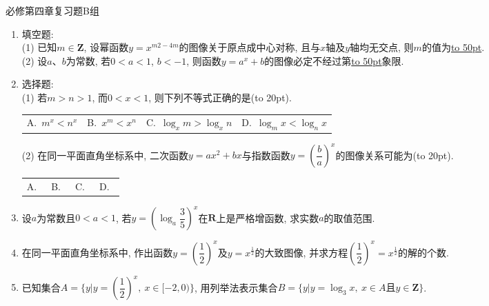 \documentclass[10pt,a4paper]{article}
\newcommand{\blank}[1]{\underline{\hbox to #1pt{}}}
\newcommand{\bracket}[1]{(\hbox to #1pt{})}
\newcommand{\fourch}[4]{\par\begin{tabular}{p{.23\textwidth}p{.23\textwidth}p{.23\textwidth}p{.23\textwidth}}
A.~#1 &B.~#2& C.~#3& D.~#4
\end{tabular}}
\begin{document}
必修第四章复习题B组
\begin{enumerate}[1.]
\item 填空题:\\
(1) 已知$m\in \mathbf{Z}$, 设幂函数$y=x^{m2-4m}$的图像关于原点成中心对称, 且与$x$轴及$y$轴均无交点, 则$m$的值为\blank{50}.\\
(2) 设$a$、$b$为常数, 若$0<a<1$, $b<-1$, 则函数$y=a^x+b$的图像必定不经过第\blank{50}象限.
\item 选择题:\\
(1) 若$m>n>1$, 而$0<x<1$, 则下列不等式正确的是\bracket{20}.
\fourch{$m^x<n^x$}{$x^m<x^n$}{$\log_x m>\log_x n$}{$\log_m x<\log_n x$}
(2) 在同一平面直角坐标系中, 二次函数$y=ax^2+bx$与指数函数$y=(\dfrac ba)^x$的图像关系可能为\bracket{20}.
\fourch{
\begin{tikzpicture}[scale = 0.5, >=latex]
    \draw [->] (-2.5,0) -- (2.5,0) node [below] {$x$};
    \draw [->] (0,-2.) -- (0,2.5) node [left] {$y$};
    \draw (0,0) node [below right] {$O$};
    \draw (-1,0.1) -- (-1,0) node [below] {$-1$};
    \draw (0.1,1) -- (0,1) node [left] {$1$};
    \draw [domain = -1.2:0.7,thick] plot (\x,{3*\x * (\x+0.5)});
    \draw [domain = -1.4:2,thick] plot (\x,{(0.5)^\x}); 
\end{tikzpicture}
}{
\begin{tikzpicture}[scale = 0.5, >=latex]
    \draw [->] (-2.5,0) -- (2.5,0) node [below] {$x$};
    \draw [->] (0,-2.) -- (0,2.5) node [left] {$y$};
    \draw (0,0) node [below left] {$O$};
    \draw (1,0.1) -- (1,0) node [below] {$1$};
    \draw (0.1,1) -- (0,1) node [above right] {$1$};
    \draw [domain = -0.5:1.5,thick] plot (\x,{3*\x*(\x-1)});
    \draw [domain = -1.4:2,thick] plot (\x,{(0.5)^\x}); 
\end{tikzpicture}
}{
\begin{tikzpicture}[scale = 0.5, >=latex]
    \draw [->] (-2.5,0) -- (2.5,0) node [below] {$x$};
    \draw [->] (0,-2.) -- (0,2.5) node [left] {$y$};
    \draw (0,0) node [below left] {$O$};
    \draw (1,0.1) -- (1,0) node [below] {$1$};
    \draw (0.1,1) -- (0,1) node [left] {$1$};
    \draw [domain = -0.5:2.5,thick] plot ({\x},{-\x*(\x-2)});
    \draw [domain = -1.4:2,thick] plot ({-\x},{(0.5)^\x}); 
\end{tikzpicture}
}{
\begin{tikzpicture}[scale = 0.5, >=latex]
    \draw [->] (-2.5,0) -- (2.5,0) node [below] {$x$};
    \draw [->] (0,-2.) -- (0,2.5) node [left] {$y$};
    \draw (0,0) node [below right] {$O$};
    \draw (-1,0.1) -- (-1,0) node [below] {$-1$};
    \draw (0.1,1) -- (0,1) node [right] {$1$};
    \draw [domain = -2.5:0.5,thick] plot ({\x},{-\x*(\x+2)});
    \draw [domain = -1.4:2,thick] plot ({\x},{(0.5)^\x}); 
\end{tikzpicture}   
}
\item 设$a$为常数且$0<a<1$, 若$y=(\log_a \dfrac 35)^x$在$\mathbf{R}$上是严格增函数, 求实数$a$的取值范围.
\item 在同一平面直角坐标系中, 作出函数$y=(\dfrac 12)^x$及$y=x^{\frac 12}$的大致图像, 并求方程$(\dfrac 12)^x=x^{\frac 12}$的解的个数.
\item 已知集合$A=\{y|y=(\dfrac 12)^x,\  x\in [-2, 0)\}$, 用列举法表示集合$B=\{y|y=\log_3x,\  x\in A\text{且}y\in \mathbf{Z}\}$.
\end{enumerate}
\end{document}
